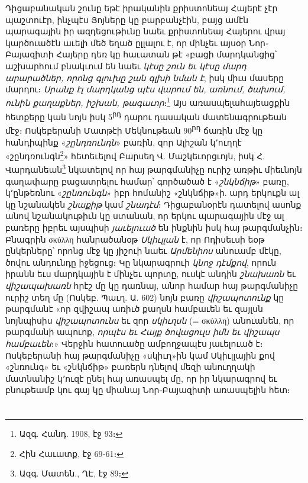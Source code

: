 \documentclass{article}
\begin{document}
{Դիցաբանական շունը եթէ իրականին քրիստոնեայ Հայերէ չէր պաշտուէր, ինչպէս Յոյները կը բարբանչէին, բայց ամէն պարագային իր ազդեցութիւնը նաեւ քրիստոնեայ Հայերու վրայ կարծուածէն աւելի մեծ եղած ըլլալու է, որ մինչեւ այսօր Նոր֊Բայազիտի Հայերը դեռ կը հաւատան թէ «բացի մարդկանցից՝ աշխարհում բնակւում են նաեւ \emph{կէսը շուն եւ կէսը մարդ արարածներ, որոնց գլուխը շան գլխի նման է}, իսկ միւս մասերը մարդու։ \emph{Սրանք էլ մարդկանց պէս վարում են, առնում, ծախում, ունին քաղաքներ, իշխան, թագաւոր}։\footnote{Ազգ. Հանդ. 1908, էջ 93։} Այս առասպելահայեացքին հետքերը կան նոյն իսկ 5\textsuperscript{րդ} դարու դասական մատենագրութեան մէջ։ Ոսկեբերանի Մատթէի Մեկնութեան 90\textsuperscript{րդ} ճառին մէջ կը հանդիպինք «\emph{շընդռունդն}» բառին, զոր Ալիշան կ՚ուղղէ «շընդռունգն\footnote{Հին Հաւատք, էջ 69֊61։}» հետեւելով Բարսեղ Վ. Մաշկեւորցւոյն, իսկ Հ. Վարդանեան\footnote{Ազգ. Մատեն., ՂԷ, էջ 89։} նկատելով որ հայ թարգմանիչը ուրիշ առթիւ միեւնոյն գաղափարը բացատրելու համար՝ գործածած է «\emph{շնկնճիթ}» բառը, կ՚ընթեռնու «\emph{շընռունգն}» իբր հոմանիշ «շնկնճիթ»ի. արդ երկուքն ալ կը նշանակեն \emph{շնաքիթ} կամ \emph{շնադէմ}։ Դիցաբանօրէն դատելով ասոնք անով նշանակութիւն կը ստանան, որ երկու պարագային մէջ ալ բառերը իբրեւ այսպիսի \emph{յաւելուած} են ինքնին իսկ հայ թարգմանչին։ Բնագրին σκύλλη հանրածանօթ \emph{Սկիւլլան} է, որ Ոդիսեւսի եօթ ընկերները՝ որոնց մէջ կը յիշուի նաեւ \emph{Արմենիոս} անուամբ մէկը, ծովու անդունդը իջեցուց։ Կը նկարագրուի \emph{կնոջ դէմքով}, որուն իրանն եւս մարդկային է մինչեւ պորտը, ուսկէ անդին \emph{շնախառն} եւ \emph{վիշապախառն} հրէշ մը կը դառնայ, անոր համար հայ թարգմանիչը ուրիշ տեղ մը (Ոսկեբ. Պաւղ. Ա. 602) նոյն բառը \emph{վիշապոտունք} կը թարգմանէ «որ զվիշապ առիւծ քաղսն համբաւեն եւ զայլսն նոյնպիսիս \emph{վիշապոտունս} եւ զոր \emph{սկիւղսն} (= σκύλλη) անուանեն, որ թարգմանի ապուոք, \emph{որպէս եւ Հայք ծովացուլս իմն եւ վիշապս համբաւեն}։» Վերջին հատուածը ամբողջապէս յաւելուած է։ Ոսկեբերանի հայ թարգմանիչը «սկիւղ»ին կամ Սկիւլլային քով «շնռունգ» եւ «շնկնճիթ» բառերն դնելով մեզի անուղղակի մատնանիշ կ՚ուզէ ընել հայ առասպել մը, որ իր նկարագրով եւ բնութեամբ կու գայ կը միանայ Նոր֊Բայազիտի առասպելին հետ։}
\clearpage
\section{}
\subsection{}
\end{document}
